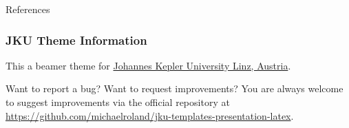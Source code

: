\documentclass[utf8,aspectratio=169,ngerman,english]{beamer}
\begin{document}
\begin{frame}[allowframebreaks]{References}
\printbibliography
\end{frame}


\begin{frame}
\frametitle{JKU Theme Information}

This a beamer theme for \href{https://www.jku.at/}{Johannes Kepler University Linz, Austria}.

\bigskip
\begin{exampleblock}{Want to report a bug? Want to request improvements?}
You are always welcome to suggest improvements via the official repository at \url{https://github.com/michaelroland/jku-templates-presentation-latex}.
\end{exampleblock}
\end{frame}


\jkulogo
\end{document}
